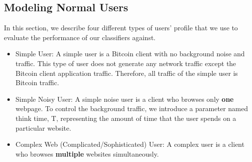 \subsection{Modeling Normal Users}\label{simpleuser}

In this section, we describe four different types of users' profile that we use to evaluate the performance of our \bc classifiers against.%

\begin{itemize}
    \item Simple User: A simple user is a Bitcoin client with no background noise and traffic. This type of user does not generate any network traffic except the Bitcoin client application traffic. Therefore, all traffic of the simple user is Bitcoin traffic. 
    \item Simple Noisy User: A simple noise user is a \bc client who browses only \textbf{one} webpage.%
    To control the background traffic, we introduce a parameter named think time, T, representing the amount of time that the user spends on a particular website. %
    \item Complex Web (Complicated/Sophisticated) User: A complex user is a \bc client who browses \textbf{multiple} websites simultaneously.
    

\begin{comment}
    The complex web user is the sophisticated version of the simple noisy user. 


\end{comment}
\end{itemize}
